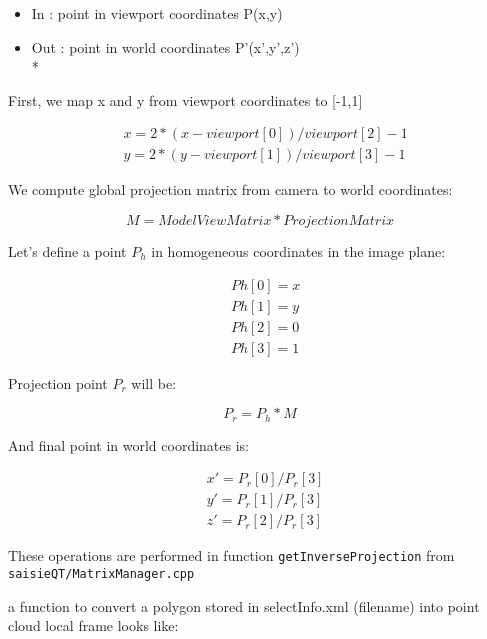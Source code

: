\begin{itemize}
\item In  : point in viewport coordinates P(x,y)
\item Out : point in world coordinates P'(x',y',z')\\*
\end{itemize}

First, we map x and y from viewport coordinates to [-1,1]

\begin{eqnarray*}
        & x = 2 * ( x - viewport[0] ) / viewport[2] - 1\\
    & y = 2 * ( y - viewport[1] ) / viewport[3] - 1
\end{eqnarray*}

We compute global projection matrix from camera to world coordinates:

\begin{equation*}
        M  = ModelViewMatrix * ProjectionMatrix
\end{equation*}

Let's define a point $P_h$ in homogeneous coordinates in the image plane:

\begin{eqnarray*}
        & Ph[0] = x\\
        & Ph[1] = y\\
        & Ph[2] = 0\\
        & Ph[3] = 1
\end{eqnarray*}

Projection point $P_r$ will be:

\begin{equation*}
        P_r = P_h*M
\end{equation*}

And final point in world coordinates is:

\begin{eqnarray*}
        & x' = P_{r}[0]/P_{r}[3] \\
        & y' = P_{r}[1]/P_{r}[3] \\
        & z' = P_{r}[2]/P_{r}[3]
\end{eqnarray*}


These operations are performed in function {\tt getInverseProjection} from {\tt saisieQT/MatrixManager.cpp }

a function to convert a polygon stored in selectInfo.xml (filename) into point cloud local frame looks like:


